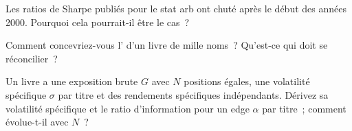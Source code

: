 \begin{interviewq}\label{iq:s1:anatomy-of-a-stat-arb-book:4}
Les ratios de Sharpe publiés pour le stat arb ont chuté après le début des années 2000. Pourquoi cela pourrait-il être le cas~?
\end{interviewq}

\begin{interviewq}\label{iq:s1:anatomy-of-a-stat-arb-book:5}
Comment concevriez-vous l' d'un livre de mille noms~? Qu'est-ce qui doit se réconcilier~?
\end{interviewq}

\begin{interviewq}\label{iq:s1:anatomy-of-a-stat-arb-book:6}
Un livre a une exposition brute $G$ avec $N$ positions égales, une volatilité spécifique $\sigma$ par titre et des rendements spécifiques indépendants. Dérivez sa volatilité spécifique et le
ratio d'information pour un edge $\alpha$ par titre~; comment évolue-t-il avec $N$~?
\end{interviewq}
